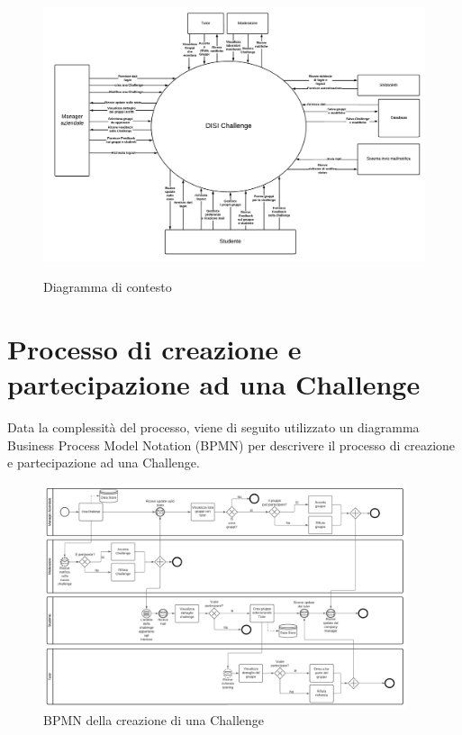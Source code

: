 \begin{figure}[H]
    \centering
    \includegraphics[scale=0.43]{images/diagrama_di_contesto.png}
    \label{fig:diagrama_di_contesto}
    \caption{Diagramma di contesto}
\end{figure}

\section{Processo di creazione e partecipazione ad una Challenge}

Data la complessità del processo, viene di seguito utilizzato un diagramma Business Process Model Notation (BPMN) per descrivere il processo di creazione e partecipazione ad una Challenge. 

\begin{figure}[H]
    \centering
        \includegraphics[width=0.95\textwidth]{images/BPMN_Challenge.png}
    \caption{BPMN della creazione di una Challenge}
    \label{fig:BPMN_Challenge}
\end{figure}


